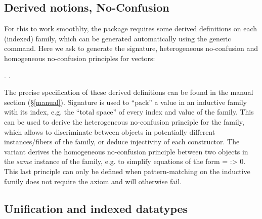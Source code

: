 \subsection{Derived notions, No-Confusion}




    For this to work smoothlty, the package requires some derived definitions
    on each (indexed) family, which can be generated automatically using
    the generic  command. Here we ask to generate the signature,
    heterogeneous no-confusion and homogeneous no-confusion principles for vectors: \begin{coqdoccode}
\coqdocemptyline
\coqdocnoindent
{}   .\coqdoceol
\coqdocnoindent
{}     .\coqdoceol
\coqdocemptyline
\end{coqdoccode}
The precise specification of these derived definitions can be found in the manual
    section (\S \ref{manual}). Signature is used to ``pack'' a value in an inductive family
    with its index, e.g. the ``total space'' of every index and value of the family. This
    can be used to derive the heterogeneous no-confusion principle for the family, which
    allows to discriminate between objects in potentially different instances/fibers of the family,
    or deduce injectivity of each constructor. The  variant derives
    the homogeneous no-confusion principle between two objects in the \textit{same} instance
    of the family, e.g. to simplify equations of the form  =  :>   0.
    This last principle can only be defined when pattern-matching on the inductive family
    does not require the  axiom and will otherwise fail.


\subsection{Unification and indexed datatypes}




